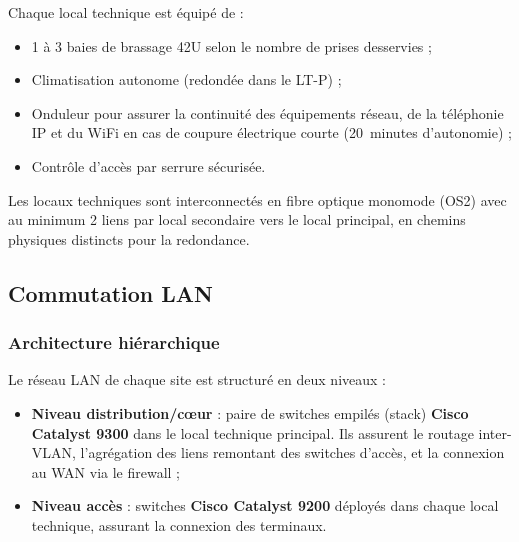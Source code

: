 \documentclass[12pt,a4paper]{report}
\begin{document}
Chaque local technique est équipé de :
\begin{itemize}
\item 1 à 3 baies de brassage 42U selon le nombre de prises desservies ;
\item Climatisation autonome (redondée dans le LT-P) ;
\item Onduleur pour assurer la continuité des équipements réseau, de la téléphonie IP et du WiFi en cas de coupure électrique courte (20~minutes d'autonomie) ;
\item Contrôle d'accès par serrure sécurisée.
\end{itemize}

Les locaux techniques sont interconnectés en fibre optique monomode (OS2) avec au minimum 2 liens par local secondaire vers le local principal, en chemins physiques distincts pour la redondance.

\subsection{Commutation LAN}

\subsubsection{Architecture hiérarchique}

Le réseau LAN de chaque site est structuré en deux niveaux :

\begin{itemize}
\item \textbf{Niveau distribution/c\oe ur} : paire de switches empilés (stack) \textbf{Cisco Catalyst 9300} dans le local technique principal. Ils assurent le routage inter-VLAN, l'agrégation des liens remontant des switches d'accès, et la connexion au WAN via le firewall ;
\item \textbf{Niveau accès} : switches \textbf{Cisco Catalyst 9200} déployés dans chaque local technique, assurant la connexion des terminaux.
\end{itemize}
\end{document}
